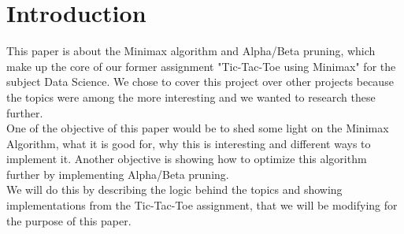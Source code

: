 \section{Introduction}
\label{sec:introduction} %
    This paper is about the Minimax algorithm and Alpha/Beta pruning, which make up the core of our former assignment 
    "Tic-Tac-Toe using Minimax" for the subject Data Science. We chose to cover this project over other projects because 
    the topics were among the more interesting and we wanted to research these further.
    \\
    One of the objective of this paper would be to shed some light on the Minimax Algorithm, 
    what it is good for, why this is interesting and different ways to implement it.
    Another objective is showing how to optimize this algorithm further by implementing Alpha/Beta pruning.    
    \\
    We will do this by describing the logic behind the topics and showing implementations from the Tic-Tac-Toe assignment,
    that we will be modifying for the purpose of this paper.    
\clearpage
